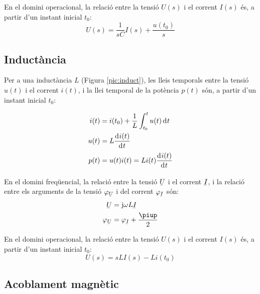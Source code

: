 En el domini operacional, la relació entre la tensió $U(s)$ i el corrent $I(s)$ és, a partir d'un instant inicial $t_0$:
\begin{equation}
   U(s) = \frac{1}{s C} I(s) + \frac{u(t_0)}{s}
\end{equation}


\subsection{Inductància} 

Per a una inductància $L$ (Figura \vref{pic:induct}),
les lleis temporals entre la tensió $u(t)$ i el corrent $i(t)$, i la llei temporal
de la potència $p(t)$ són,  a partir d'un instant inicial $t_0$:

\hfill
\begin{minipage}[b]{5cm}
    
    \label{pic:induct}
\end{minipage}
\hfill
\begin{minipage}[b][3.8cm][t]{8cm}
   \begin{align}
      i(t) &= i(t_0) + \frac{1}{L} \int_{t_0}^t u(t) \diff t \\
      u(t) &= L \deriv{i(t)}{t} \\
      p(t) &= u(t) i(t) = L i(t) \deriv{i(t)}{t}
   \end{align}
\end{minipage}

En el domini freqüencial, la relació entre la tensió $\cmplx{U}$ i el corrent $\cmplx{I}$, i la relació entre els arguments de la tensió $\varphi_{\cmplx{U}}$ i del corrent $\varphi_{\cmplx{I}}$ són:
\begin{align}
   \cmplx{U} &= \ju \omega L \cmplx{I} \\
   \varphi_{\cmplx{U}} &= \varphi_{\cmplx{I}} + \frac{\piup}{2}
\end{align}

 En el domini operacional, la relació entre la tensió $U(s)$ i el corrent $I(s)$ és, a partir d'un instant inicial $t_0$:
\begin{equation}
   U(s) = s L I(s) - L i(t_0)
\end{equation}


\subsection{Acoblament magnètic} 

